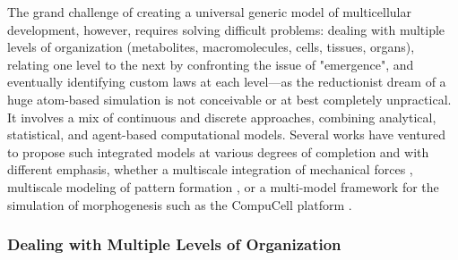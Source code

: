   The grand challenge of creating a universal generic model of multicellular development, however, requires solving difficult problems: dealing with multiple levels of organization (metabolites, macromolecules, cells, tissues, organs), relating one level to the next by confronting the issue of "emergence", and eventually identifying custom laws at each level---as the reductionist dream of a huge atom-based simulation is not conceivable or at best completely unpractical. It involves a mix of continuous and discrete approaches, combining analytical, statistical, and agent-based computational models. Several works have ventured to propose such integrated models at various degrees of completion and with different emphasis, whether a multiscale integration of mechanical forces \cite{Blanchard:2011hk}\cite{vanLeeuwen:2009ev}, multiscale modeling of pattern formation \cite{Grima:2008ct}\cite{Little:2011cs}, or a multi-model framework for the simulation of morphogenesis such as the CompuCell platform \cite{Izaguirre:2004vr}\cite{Cickovski:2007tj}\cite{Swat:2008di}. 

\subsubsection{Dealing with Multiple Levels of Organization }

